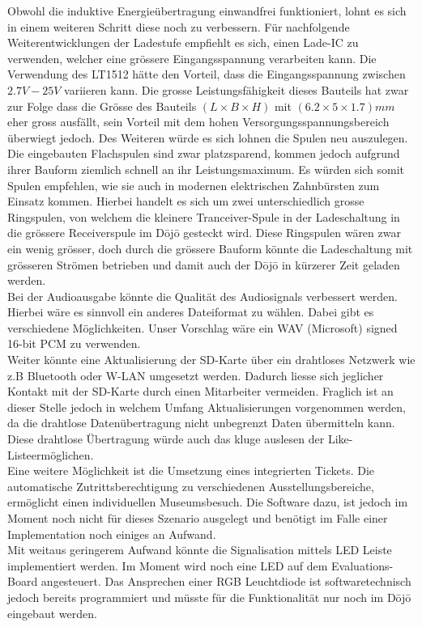 Obwohl die induktive Energieübertragung einwandfrei funktioniert, lohnt es sich in einem weiteren Schritt diese noch zu verbessern. Für nachfolgende Weiterentwicklungen der Ladestufe empfiehlt es sich, einen Lade-IC zu verwenden, welcher eine grössere Eingangsspannung verarbeiten kann. Die Verwendung des LT1512 hätte den Vorteil, dass die Eingangsspannung zwischen $2.7V - 25V$ variieren kann. Die grosse Leistungsfähigkeit dieses Bauteils hat zwar zur Folge dass die Grösse des Bauteils $(L \times B \times H)$ mit $(6.2\times 5\times 1.7)mm$ eher gross ausfällt, sein Vorteil mit dem hohen Versorgungsspannungsbereich überwiegt jedoch. Des Weiteren würde es sich lohnen die Spulen neu auszulegen. Die eingebauten Flachspulen sind zwar platzsparend, kommen jedoch aufgrund ihrer Bauform ziemlich schnell an ihr Leistungsmaximum. Es würden sich somit Spulen empfehlen, wie sie auch in modernen elektrischen Zahnbürsten zum Einsatz kommen. Hierbei handelt es sich um zwei unterschiedlich grosse Ringspulen, von welchem die kleinere Tranceiver-Spule in der Ladeschaltung in die grössere Receiverspule im Dōjō gesteckt wird. Diese Ringspulen wären zwar ein wenig grösser, doch durch die grössere Bauform könnte die Ladeschaltung mit grösseren Strömen betrieben und damit auch der Dōjō in kürzerer Zeit geladen werden.\\
Bei der Audioausgabe könnte die Qualität des Audiosignals verbessert werden. Hierbei wäre es sinnvoll ein anderes Dateiformat zu wählen. Dabei gibt es verschiedene Möglichkeiten. Unser Vorschlag wäre ein WAV (Microsoft) signed 16-bit PCM zu verwenden.\\
Weiter könnte eine Aktualisierung der SD-Karte über ein drahtloses Netzwerk wie z.B Bluetooth oder W-LAN umgesetzt werden. Dadurch liesse sich jeglicher Kontakt mit der SD-Karte durch einen Mitarbeiter vermeiden. Fraglich ist an dieser Stelle jedoch in welchem Umfang Aktualisierungen vorgenommen werden, da die drahtlose Datenübertragung nicht unbegrenzt Daten übermitteln kann. Diese drahtlose Übertragung würde auch das kluge auslesen der \glqq Like-Liste\grqq ermöglichen.\\
Eine weitere Möglichkeit ist die Umsetzung eines integrierten Tickets. Die automatische Zutrittsberechtigung zu verschiedenen Ausstellungsbereiche, ermöglicht einen individuellen Museumsbesuch. Die Software dazu, ist jedoch im Moment noch nicht für dieses Szenario ausgelegt und benötigt im Falle einer Implementation noch einiges an Aufwand.\\
Mit weitaus geringerem Aufwand könnte die Signalisation mittels LED Leiste implementiert werden. Im Moment wird noch eine LED auf dem Evaluations-Board angesteuert. Das Ansprechen einer RGB Leuchtdiode ist softwaretechnisch jedoch bereits programmiert und müsste für die Funktionalität nur noch im Dōjō eingebaut werden.